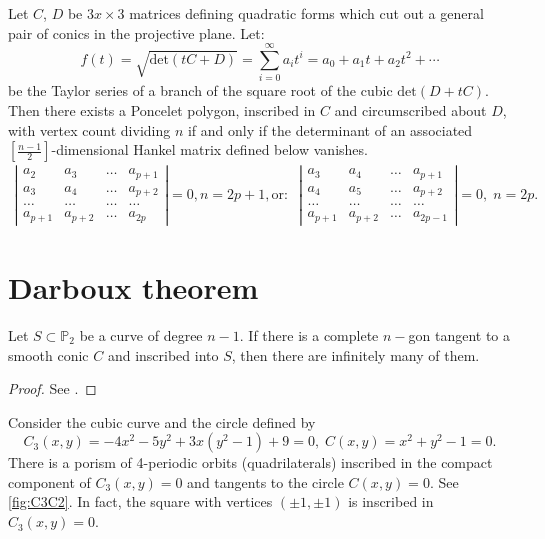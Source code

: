 Let $C$, $D $ be $3x\times 3$ matrices defining quadratic forms which cut out a general pair of conics in the projective plane. Let:
\[f(t)=\sqrt{\mathrm{det}(tC+D)}=\sum_{i=0}^\infty a_it^i=a_0+a_1t+a_2t^2+\cdots
 \]
 be the Taylor series of a branch of the square root of the cubic 
$\mathrm{det}(D+tC)$.
 Then there exists a Poncelet polygon, inscribed in 
$C$ and circumscribed about 
$D$, with vertex count dividing $n$
 if and only if the determinant of an associated 
$[\frac{n-1}{2}]$-dimensional Hankel matrix defined below vanishes. 
 {\small 
 \begin{align*}
     \left|\begin{matrix} a_2 &a_3 &\ldots & a_{p+1}\\
     a_3 & a_4&\ldots & a_{p+2}\\
     \ldots & \ldots & \ldots &\ldots\\
     a_{p+1}& a_{p+2}&\ldots & a_{2p}
     \end{matrix}\right|=0, n=2p+1, \mathrm{or}:\;\;  \left|\begin{matrix} a_3 &a_4 &\ldots & a_{p+1}\\
     a_4 & a_5&\ldots & a_{p+2}\\
     \ldots & \ldots & \ldots &\ldots\\
     a_{p+1}& a_{p+2}&\ldots & a_{2p-1}
     \end{matrix}\right|=0,\; n=2p.
 \end{align*}
 }
\section{Darboux theorem}

\begin{theorem} Let $ S\subset \mathbb{P}_2$
  be a curve of degree $n-1$. If there is a complete $n-$gon tangent
to a smooth conic $C$ and inscribed into $S$, then there are infinitely many of them.
\label{th:darboux}
\end{theorem}
\begin{proof}
See \cite[Chapitre I, page 248]{darboux1917}.
\end{proof}
\begin{example}
Consider the cubic curve and the circle defined by
\[C_3(x,y)=-4x^2-5y^2+3x(y^2-1)+9=0,\; C(x,y)=x^2+y^2-1=0.\]
There is a porism of 4-periodic orbits (quadrilaterals) inscribed in the compact component of $C_3(x,y)=0$ and tangents to the circle  $C(x,y)=0.$ See \cref{fig:C3C2}.
In fact, the square with vertices $(\pm 1, \pm 1)$ is inscribed in $C_3(x,y)=0.$
\end{example}

